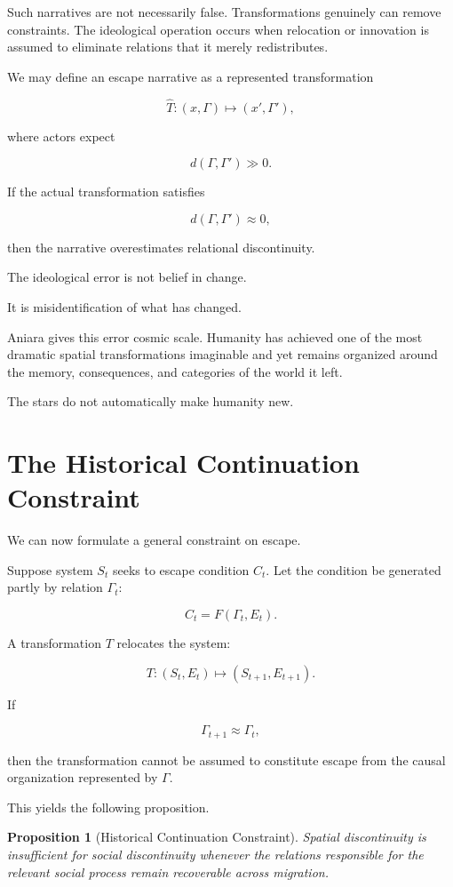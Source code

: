 \documentclass[11pt,oneside]{book}
\newtheorem{proposition}[theorem]{Proposition}
\theoremstyle{definition}
\theoremstyle{remark}
\begin{document}
Such narratives are not necessarily false. Transformations genuinely can remove constraints. The ideological operation occurs when relocation or innovation is assumed to eliminate relations that it merely redistributes.

We may define an escape narrative as a represented transformation

\[
\widehat T:
(x,\Gamma)
\mapsto
(x',\Gamma'),
\]

where actors expect

\[
d(\Gamma,\Gamma')\gg0.
\]

If the actual transformation satisfies

\[
d(\Gamma,\Gamma')\approx0,
\]

then the narrative overestimates relational discontinuity.

The ideological error is not belief in change.

It is misidentification of what has changed.

Aniara gives this error cosmic scale. Humanity has achieved one of the most dramatic spatial transformations imaginable and yet remains organized around the memory, consequences, and categories of the world it left.

The stars do not automatically make humanity new.

\section{The Historical Continuation Constraint}

We can now formulate a general constraint on escape.

Suppose system \(S_t\) seeks to escape condition \(C_t\). Let the condition be generated partly by relation \(\Gamma_t\):

\[
C_t=F(\Gamma_t,E_t).
\]

A transformation \(T\) relocates the system:

\[
T:(S_t,E_t)\mapsto(S_{t+1},E_{t+1}).
\]

If

\[
\Gamma_{t+1}\approx\Gamma_t,
\]

then the transformation cannot be assumed to constitute escape from the causal organization represented by \(\Gamma\).

This yields the following proposition.

\begin{proposition}[Historical Continuation Constraint]
Spatial discontinuity is insufficient for social discontinuity whenever the relations responsible for the relevant social process remain recoverable across migration.
\end{proposition}
\end{document}
